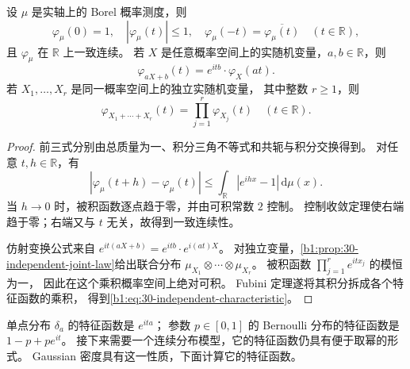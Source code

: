 \begin{proposition}\label{b1:prop:30-characteristic-basic}
设 \(\mu\) 是实轴上的 Borel 概率测度，则
\[
 \varphi_\mu(0)=1,\quad
 |\varphi_\mu(t)|\leq1,\quad
 \varphi_\mu(-t)=\overline{\varphi_\mu(t)}
 \quad(t\in\mathbb R),
\]
且 \(\varphi_\mu\) 在 \(\mathbb R\) 上一致连续。
若 \(X\) 是任意概率空间上的实随机变量，\(a,b\in\mathbb R\)，则
\[
 \varphi_{aX+b}(t)=e^{itb}\cdot\varphi_X(at).
\]
若 \(X_1,\ldots,X_r\) 是同一概率空间上的独立实随机变量，
其中整数 \(r\geq1\)，则
\begin{equation}\label{b1:eq:30-independent-characteristic}
 \varphi_{X_1+\cdots+X_r}(t)
 =\prod_{j=1}^r\varphi_{X_j}(t)
 \quad(t\in\mathbb R).
\end{equation}
\end{proposition}
\begin{proof}
前三式分别由总质量为一、积分三角不等式和共轭与积分交换得到。
对任意 \(t,h\in\mathbb R\)，有
\[
 |\varphi_\mu(t+h)-\varphi_\mu(t)|
 \leq\int_{\mathbb R}|e^{ihx}-1|\,\mathrm d\mu(x).
\]
当 \(h\to0\) 时，被积函数逐点趋于零，并由可积常数 \(2\) 控制。
控制收敛定理使右端趋于零；右端又与 \(t\) 无关，故得到一致连续性。

仿射变换公式来自
\(e^{it(aX+b)}=e^{itb}\cdot e^{i(at)X}\)。
对独立变量，\cref{b1:prop:30-independent-joint-law}给出联合分布
\(\mu_{X_1}\otimes\cdots\otimes\mu_{X_r}\)。
被积函数 \(\prod_{j=1}^r e^{itx_j}\) 的模恒为一，
因此在这个乘积概率空间上绝对可积。
Fubini 定理遂将其积分拆成各个特征函数的乘积，
得到\eqref{b1:eq:30-independent-characteristic}。
\end{proof}

单点分布 \(\delta_a\) 的特征函数是 \(e^{ita}\)；
参数 \(p\in[0,1]\) 的 Bernoulli 分布的特征函数是
\(1-p+p e^{it}\)。
接下来需要一个连续分布模型，它的特征函数仍具有便于取幂的形式。
Gaussian 密度具有这一性质，下面计算它的特征函数。

